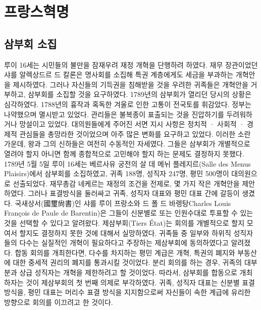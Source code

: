 \chapter{프랑스혁명}
\section{삼부회 소집}
루이 16세는 시민들의 불만을 잠재우려 재정 개혁을 단행하려 하였다. 재무 장관이었던 샤를 알렉상드르 드 칼론은 명사회를 소집해 특권 계층에게도 세금을 부과하는 개혁안을 제시하였다. 그러나 자신들의 기득권을 침해받을 것을 우려한 귀족들은 개혁안을 거부하고, 삼부회를 소집할 것을 요구하였다. 1789년의 삼부회가 열리던 당시의 상황은 심각하였다. 1788년의 흉작과 혹독한 겨울로 인한 고통이 전국토를 휘감았다. 정부는 나약했으며 멸시받고 있었다. 관리들은 불복종이 표출되는 것을 진압하기를 두려워하거나 망설이고 있었다. 대의원들에게 주어진 서면 지시 사항은 정치적 · 사회적 · 경제적 관심들을 총망라한 것이었으며 아주 많은 변화를 요구하고 있었다. 이러한 소란 가운데, 왕과 그의 신하들은 여전히 수동적인 자세였다. 그들은 삼부회가 개별적으로 열려야 할지 아니면 함께 종합적으로 고민해야 할지 하는 문제도 결정하지 못했다. 1789년 5월 5일 루이 16세는 베르사유 궁전의 살 데 메뉘 플레지르(Salle des Menus Plaisirs)에서 삼부회를 소집하였고, 귀족 188명, 성직자 247명, 평민 500명이 대의원으로 선출되었다. 재무총감 네케르는 재정의 조건을 전제로, 몇 가지 작은 개혁안을 제안하였다. 그러나 표결방식을 둘러싸고 귀족, 성직자 대표와 평민 대표 간에 갈등이 생겼다. 국새상서(國璽尙書)인 샤를 루이 프랑소와 드 폴 드 바렝탕Charles Louis François de Paule de Barentin)은 그들이 신분별로 또는 인원수대로 투표할 수 있는 것을 선택할 수 있다고 알려왔다. 제삼부회(Tiers État)는 회의를 개별적으로 할지 모여서 할지도 결정하지 못한 것에 대해서 실망하였다. 귀족들 중 일부와 하위직 성직자들의 다수는 실질적인 개혁이 필요하다고 주장하는 제삼부회에 동의하였다고 알려졌다. 합동 회의를 개최한다면, 다수를 차지하는 평민 계급은 개혁, 특권의 폐지와 부동산에 대한 중세적 권리의 폐지를 통과시킬 것이었다. 분리 회의를 하는 경우, 귀족의 대부분과 상급 성직자는 개혁을 제한하려고 할 것이었다. 따라서, 삼부회를 합동으로 개최하자는 것이 제삼부회의 첫 번째 의제로 부각하였다. 귀족, 성직자 대표는 신분별 표결 방식을, 평민 대표는 머리수 표결 방식을 지지함으로써 자신들이 속한 계급에 유리한 방향으로 회의를 이끄려고 한 것이다.

